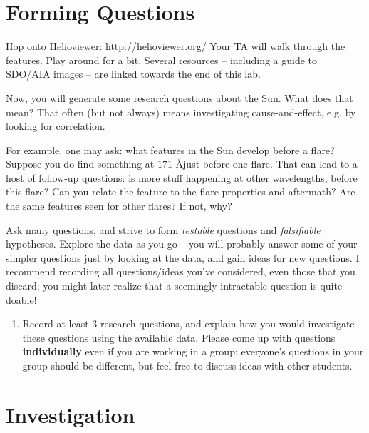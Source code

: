 \documentclass[11pt]{article}%
\newcommand{\SPACE}{\vspace{3em}}
\begin{document}
\section{Forming Questions}

Hop onto Helioviewer: \url{http://helioviewer.org/}
Your TA will walk through the features.  Play around for a bit.
Several resources -- including a guide to SDO/AIA images -- are linked towards
the end of this lab.

Now, you will generate some research questions about the Sun.
What does that mean?  That often (but not always) means investigating
cause-and-effect, e.g. by looking for correlation.

For example, one may ask: what features in the Sun develop before a flare?
Suppose you do find something at $171$ \AA just before one flare.
That can lead to a host of follow-up questions:
is more stuff happening at other wavelengths, before this flare?
Can you relate the feature to the flare properties and aftermath?
Are the same features seen for other flares?  If not, why?

Ask many questions, and strive to form \emph{testable} questions and
\emph{falsifiable} hypotheses.  Explore the data as you go -- you will probably
answer some of your simpler questions just by looking at the data, and gain
ideas for new questions.
I recommend recording all questions/ideas you've considered, even those that
you discard; you might later realize that a seemingly-intractable question is
quite doable!
\newpage
\begin{enumerate}
\item Record at least 3 research questions, and explain how you would investigate these questions using the available data. Please come up with questions \textbf{individually} even if you are working in a group; everyone's questions in your group should be different, but feel free to discuss ideas with other students.\SPACE \SPACE
\end{enumerate}


\section{Investigation}
\end{document}

